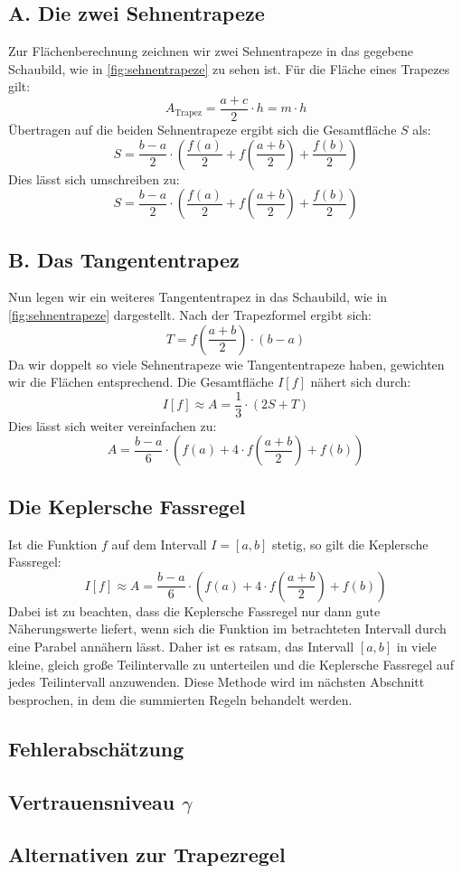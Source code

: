 \subsection*{A. Die zwei Sehnentrapeze}

Zur Flächenberechnung zeichnen wir zwei Sehnentrapeze in das gegebene Schaubild, wie in \autoref{fig:sehnentrapeze} zu sehen ist. Für die Fläche eines Trapezes gilt:
\[
A_{\text{Trapez}} = \frac{a + c}{2} \cdot h = m \cdot h
\]
Übertragen auf die beiden Sehnentrapeze ergibt sich die Gesamtfläche $S$ als:
\[
S = \frac{b - a}{2} \cdot \left(\frac{f(a)}{2} + f\left(\frac{a + b}{2}\right) + \frac{f(b)}{2}\right)
\]
Dies lässt sich umschreiben zu:
\[
S = \frac{b - a}{2} \cdot \left(\frac{f(a)}{2} + f\left(\frac{a + b}{2}\right) + \frac{f(b)}{2}\right)
\]

\subsection*{B. Das Tangententrapez}

Nun legen wir ein weiteres Tangententrapez in das Schaubild, wie in \autoref{fig:sehnentrapeze} dargestellt. Nach der Trapezformel ergibt sich:
\[
T = f\left(\frac{a + b}{2}\right) \cdot (b - a)
\]
Da wir doppelt so viele Sehnentrapeze wie Tangententrapeze haben, gewichten wir die Flächen entsprechend. Die Gesamtfläche $I[f]$ nähert sich durch:
\[
I[f] \approx A = \frac{1}{3} \cdot (2S + T)
\]
Dies lässt sich weiter vereinfachen zu:
\[
A = \frac{b - a}{6} \cdot \left(f(a) + 4 \cdot f\left(\frac{a + b}{2}\right) + f(b)\right)
\]

\subsection*{Die Keplersche Fassregel}

Ist die Funktion $f$ auf dem Intervall $I = [a, b]$ stetig, so gilt die Keplersche Fassregel:
\[
I[f] \approx A = \frac{b - a}{6} \cdot \left(f(a) + 4 \cdot f\left(\frac{a + b}{2}\right) + f(b)\right)
\]
Dabei ist zu beachten, dass die Keplersche Fassregel nur dann gute Näherungswerte liefert, wenn sich die Funktion im betrachteten Intervall durch eine Parabel annähern lässt. Daher ist es ratsam, das Intervall $[a, b]$ in viele kleine, gleich große Teilintervalle zu unterteilen und die Keplersche Fassregel auf jedes Teilintervall anzuwenden. Diese Methode wird im nächsten Abschnitt besprochen, in dem die summierten Regeln behandelt werden. \cite{skript}

\subsection{Fehlerabschätzung}
\label{sec:fehlerabschätzung}

\subsection{Vertrauensniveau $\gamma$}
\label{sec:vertrauensniveau}

\subsection{Alternativen zur Trapezregel} 
\label{sec:alternativen}
